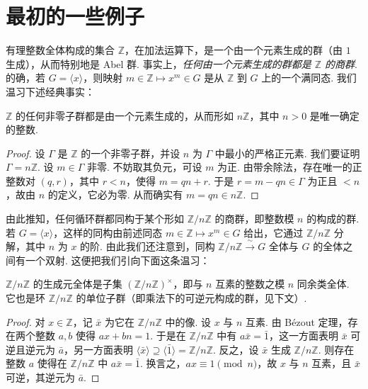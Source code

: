 \section{最初的一些例子}\label{sec:fg-1-2}

\begin{numpara}[由一个元素生成的群与循环群]\label{np:fg-1-2-1}
有理整数全体构成的集合 $\mathbb{Z}$，在加法运算下，是一个由一个元素生成的群（由 $1$ 生成），从而特别地是 Abel 群. 事实上，\emph{任何由一个元素生成的群都是 $\mathbb{Z}$ 的商群}. 的确，若 $G=\langle x\rangle$，则映射 $m\in\mathbb{Z}\mapsto x^m\in G$ 是从 $\mathbb{Z}$ 到 $G$ 上的一个满同态. 我们温习下述经典事实：
\end{numpara}

\begin{lemma*}
$\mathbb{Z}$ 的任何非零子群都是由一个元素生成的，从而形如 $n\mathbb{Z}$，其中 $n>0$ 是唯一确定的整数.
\end{lemma*}

\begin{proof}
设 $\Gamma$ 是 $\mathbb{Z}$ 的一个非零子群，并设 $n$ 为 $\Gamma$ 中最小的严格正元素. 我们要证明 $\Gamma=n\mathbb{Z}$. 设 $m\in\Gamma$ 非零. 不妨取其负元，可设 $m$ 为正. 由带余除法，存在唯一的正整数对 $(q,r)$，其中 $r<n$，使得 $m=qn+r$. 于是 $r=m-qn\in\Gamma$ 为正且 $<n$，故由 $n$ 的定义，它必为零. 从而确实有 $m=qn\in n\mathbb{Z}$.
\end{proof}

由此推知，任何循环群都同构于某个形如 $\mathbb{Z}/n\mathbb{Z}$ 的商群，即整数模 $n$ 的构成的群. 若 $G=\langle x\rangle$，这样的同构由前述同态 $m\in\mathbb{Z}\mapsto x^m\in G$ 给出，它通过 $\mathbb{Z}/n\mathbb{Z}$ 分解，其中 $n$ 为 $x$ 的阶. 由此我们还注意到，同构 $\mathbb{Z}/n\mathbb{Z}\xrightarrow{\ \sim\ }G$ 全体与 $G$ 的全体之间有一个双射. 这便把我们引向下面这条温习：

\begin{lemma*}
$\mathbb{Z}/n\mathbb{Z}$ 的生成元全体是子集 $(\mathbb{Z}/n\mathbb{Z})^\times$，即与 $n$ 互素的整数之模 $n$ 同余类全体. 它也是环 $\mathbb{Z}/n\mathbb{Z}$ 的单位子群（即乘法下的可逆元构成的群，见下文）.
\end{lemma*}

\begin{proof}
对 $x\in\mathbb{Z}$，记 $\bar{x}$ 为它在 $\mathbb{Z}/n\mathbb{Z}$ 中的像. 设 $x$ 与 $n$ 互素. 由 Bézout 定理，存在两个整数 $a,b$ 使得 $ax+bn=1$. 于是在 $\mathbb{Z}/n\mathbb{Z}$ 中有 $a\bar{x}=\bar{1}$，这一方面表明 $\bar{x}$ 可逆且逆元为 $\bar{a}$，另一方面表明 $\langle\bar{x}\rangle\supseteq\langle\bar{1}\rangle=\mathbb{Z}/n\mathbb{Z}$. 反之，设 $\bar{x}$ 生成 $\mathbb{Z}/n\mathbb{Z}$. 则存在整数 $a$ 使得在 $\mathbb{Z}/n\mathbb{Z}$ 中 $a\bar{x}=\bar{1}$. 换言之，$ax\equiv 1\pmod n$，故 $x$ 与 $n$ 互素，且 $\bar{x}$ 可逆，其逆元为 $\bar{a}$.
\end{proof}

